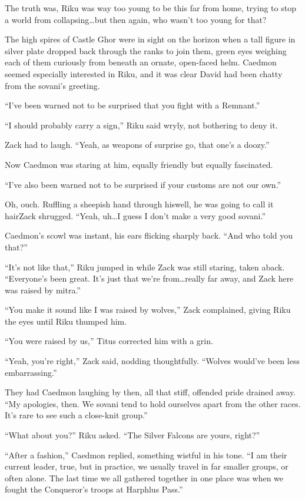 The truth was, Riku was way too young to be this far from home, trying to stop a world from collapsing\ldots but then again, who wasn't too young for that?

The high spires of Castle Ghor were in sight on the horizon when a tall figure in silver plate dropped back through the ranks to join them, green eyes weighing each of them curiously from beneath an ornate, open-faced helm. Caedmon seemed especially interested in Riku, and it was clear David had been chatty from the sovani's greeting.

``I've been warned not to be surprised that you fight with a Remnant.''

``I should probably carry a sign,'' Riku said wryly, not bothering to deny it.

Zack had to laugh. ``Yeah, as weapons of surprise go, that one's a doozy.''

Now Caedmon was staring at him, equally friendly but equally fascinated.

``I've also been warned not to be surprised if your customs are not our own.''

Oh, ouch. Ruffling a sheepish hand through his\textemdash well, he was going to call it hair\textemdash Zack shrugged. ``Yeah, uh\ldots I guess I don't make a very good sovani.''

Caedmon's scowl was instant, his ears flicking sharply back. ``And who told you that?''

``It's not like that,'' Riku jumped in while Zack was still staring, taken aback. ``Everyone's been great. It's just that we're from\ldots really far away, and Zack here was raised by mitra.''

``You make it sound like I was raised by wolves,'' Zack complained, giving Riku the eyes until Riku thumped him.

``You were raised by us,'' Titus corrected him with a grin.

``Yeah, you're right,'' Zack said, nodding thoughtfully. ``Wolves would've been less embarrassing.''

They had Caedmon laughing by then, all that stiff, offended pride drained away. ``My apologies, then. We sovani tend to hold ourselves apart from the other races. It's rare to see such a close-knit group.''

``What about you?'' Riku asked. ``The Silver Falcons are yours, right?''

``After a fashion,'' Caedmon replied, something wistful in his tone. ``I am their current leader, true, but in practice, we usually travel in far smaller groups, or often alone. The last time we all gathered together in one place was when we fought the Conqueror's troops at Harphlus Pass.''

